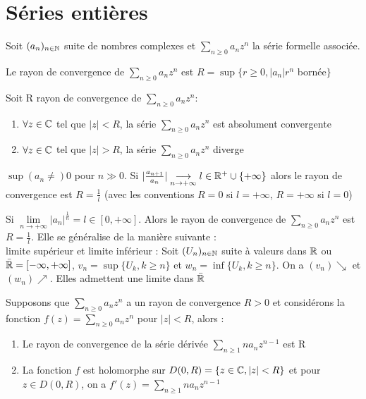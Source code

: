 \documentclass[]{report}
\begin{document}
\section{Séries entières}

Soit $(a_n)_{n\in\mathbb{N}}$ suite de nombres complexes et $\sum_{n\ge0}a_nz^n$ la série formelle associée.

\begin{df}
    Le rayon de convergence de $\sum_{n\ge0}a_n z^n$ est $R=\sup \{r\ge0,|a_n|r^n $ bornée$\}$
\end{df}

\begin{tm}
    Soit R rayon de convergence de $\sum_{n\ge0}a_n z^n$:
    \begin{enumerate}
        \item $\forall z \in \mathbb{C} $ tel que $|z|<R$, la série $\sum_{n\ge0}a_nz^n$ est absolument convergente
        \item $\forall z\in\mathbb{C}$ tel que $|z|>R$, la série $\sum_{n\ge0}a_nz^n$ diverge
    \end{enumerate}
\end{tm}

\begin{prop}
    $\sup (a_n \ne) 0$ pour $n \gg0$. Si $|\frac{a_{n+1}}{a_n}| \underset{n\to +\infty}{\longrightarrow}l \in \mathbb{R}^+\cup\{+\infty\}$ alors le rayon de convergence est $R=\frac{1}{l}$ (avec les conventions $R=0$ si $l=+\infty$, $R=+\infty$ si $l=0$)
\end{prop}

\begin{prop}
    Si $\lim\limits_{n \rightarrow +\infty}|a_n|^{\frac{1}{n}}=l \in [0,+\infty]$. Alors le rayon de convergence de $\sum_{n\ge0}a_nz^n$ est $R=\frac{1}{l}$. Elle se généralise de la manière suivante :\\
    limite supérieur et limite inférieur : Soit $(U_n)_{n\in\mathbb{N}}$ suite à valeurs dans $\mathbb{R}$ ou $\bar{\mathbb{R}}=[-\infty,+\infty]$, $v_n=\sup \{U_k,k\ge n\}$ et $w_n=\inf \{U_k, k\ge n\}$. On a $(v_n) \searrow$ et $(w_n) \nearrow$. Elles admettent une limite dans $\bar{\mathbb{R}}$
\end{prop}

\begin{prop}
    Supposons que $\sum_{n\ge0}a_nz^n$ a un rayon de convergence $R>0$ et considérons la fonction $f(z)=\sum_{n\ge0}a_nz^n$ pour $|z|<R$, alors :
    \begin{enumerate}
        \item Le rayon de convergence de la série dérivée $\sum_{n\ge1}na_nz^{n-1}$ est R
        \item La fonction $f$ est holomorphe sur $D(0,R)=\{z\in\mathbb{C}, |z|<R\}$ et pour $z \in D(0,R)$, on a $f'(z)=\sum_{n\ge1}na_nz^{n-1}$
    \end{enumerate}
\end{prop}
\end{document}
